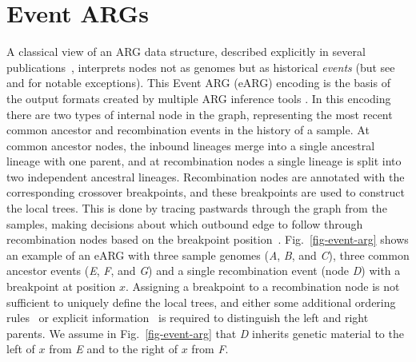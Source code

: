 \documentclass[9pt,twocolumn,twoside]{gsajnl}
\newcommand{\noderef}[1]{\textit{#1}}
\begin{document}
\section{Event ARGs}
\label{sec-eARG}
A classical view of an ARG data structure,
described explicitly in several publications~\citep[e.g.][]{
wiuf1999recombination,gusfield2014recombinatorics,hayman2023recoverability},
interprets nodes not as genomes but as historical \emph{events}
(but see~\citet{parida2011minimal} and \citet{zhang2023biobank}
for notable exceptions).
This Event ARG (eARG) encoding is the basis of the output formats 
created by multiple ARG inference tools
\citep[e.g.][]{song2004minimum,song2005efficient,rasmussen2014genome,
heine2018bridging,ignatieva2021kwarg}.
In this encoding there are two types of internal node in the graph,
representing the most recent common ancestor and recombination events
in the history of a sample.
At common ancestor nodes, the inbound lineages merge into a
single ancestral lineage with one parent, and at recombination
nodes a single lineage is split into two independent
ancestral lineages. Recombination nodes are annotated with
the corresponding crossover breakpoints, and these breakpoints
are used to construct the local trees.
This is done by tracing pastwards through the graph from the samples,
making decisions about which outbound edge to follow through
recombination nodes based on the breakpoint
position~\citep{griffiths1996ancestral}. Fig.~\ref{fig-event-arg} shows an example of an
eARG with three sample genomes (\noderef{A}, \noderef{B}, and \noderef{C}),
three common ancestor events (\noderef{E}, \noderef{F}, and \noderef{G})
and a single recombination event (node \noderef{D}) with a breakpoint
at position $x$.
Assigning a breakpoint to a recombination node is
not sufficient to uniquely define the local trees, and either
some additional ordering rules~\citep[e.g.][]{griffiths1996ancestral} or
explicit information~\citep[e.g.][]{gusfield2014recombinatorics,ignatieva2021kwarg}
is required to distinguish the left and right parents.
We assume in Fig.~\ref{fig-event-arg} that \noderef{D} inherits genetic material to the
left of $x$ from \noderef{E} and to the right of $x$ from \noderef{F}.
\end{document}
